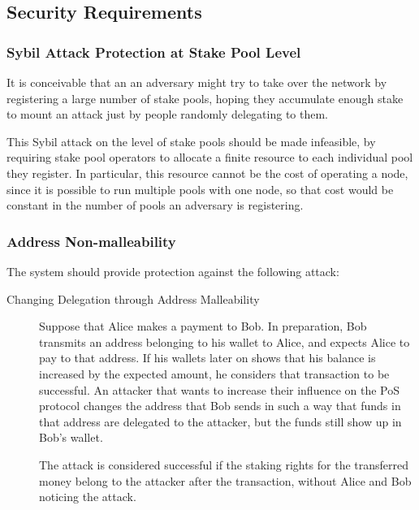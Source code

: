 \documentclass[11pt,a4paper]{article}
\begin{document}
\subsection{Security Requirements}
\label{security-requirements}

\subsubsection{Sybil Attack Protection at Stake Pool Level}
\label{sybil-attack-protection-at-stake-pool-level}

It is conceivable that an an adversary might try to take over the
network by registering a large number of stake pools, hoping they
accumulate enough stake to mount an attack just by people randomly
delegating to them.

This Sybil attack on the level of stake pools should be made infeasible,
by requiring stake pool operators to allocate a finite resource to each
individual pool they register. In particular, this resource cannot be
the cost of operating a node, since it is possible to run multiple pools
with one node, so that cost would be constant in the number of pools an
adversary is registering.

\subsubsection{Address Non-malleability}
\label{address-nonmalleability}

The system should provide protection against the following attack:

\begin{description}
\item[Changing Delegation through Address Malleability]
Suppose that Alice makes a payment to Bob. In preparation, Bob transmits
an address belonging to his wallet to Alice, and expects Alice to pay to
that address. If his wallets later on shows that his balance is
increased by the expected amount, he considers that transaction to be
successful. An attacker that wants to increase their influence on the
PoS protocol changes the address that Bob sends in such a way that funds
in that address are delegated to the attacker, but the funds still show
up in Bob's wallet.

The attack is considered successful if the staking rights for the
transferred money belong to the attacker after the transaction, without
Alice and Bob noticing the attack.
\end{description}
\end{document}
